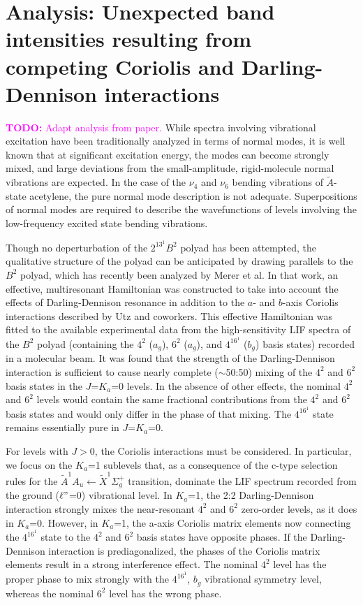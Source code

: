 \documentclass[12pt,draft]{mitthesis}
\newcommand{\TODO} [1]{\textcolor{magenta}{\textbf{TODO:} #1}}
\newcommand{\POINT}[1]{\textcolor{magenta}{#1}}
\begin{document}

\section{Analysis: Unexpected band intensities resulting from
  competing Coriolis and Darling-Dennison interactions}

\TODO{Adapt analysis from paper.}  While spectra involving vibrational
excitation have been traditionally analyzed in terms of normal modes,
it is well known that at significant excitation energy, the modes can
become strongly mixed, and large deviations from the small-amplitude,
rigid-molecule normal vibrations are expected.  In the case of the
$\nu_4$ and $\nu_6$ bending vibrations of $\tilde{A}$-state acetylene,
the pure normal mode description is not adequate. Superpositions of
normal modes are required to describe the wavefunctions of levels
involving the low-frequency excited state bending vibrations.

Though no deperturbation of the $2^13^1B^2$ polyad has been attempted,
the qualitative structure of the polyad can be anticipated by drawing
parallels to the $B^2$ polyad, which has recently been analyzed by
Merer et al.  In that work, an effective, multiresonant Hamiltonian
was constructed to take into account the effects of Darling-Dennison
resonance in addition to the $a$- and $b$-axis Coriolis interactions
described by Utz and coworkers.  This effective Hamiltonian was fitted
to the available experimental data from the high-sensitivity LIF
spectra of the $B^2$ polyad (containing the $4^2$ ($a_g$), $6^2$
($a_g$), and $4^16^1$ ($b_g$) basis states) recorded in a molecular
beam. It was found that the strength of the Darling-Dennison
interaction is sufficient to cause nearly complete ($\sim$50:50)
mixing of the $4^2$ and $6^2$ basis states in the $J$=$K_a$=0
levels. In the absence of other effects, the nominal $4^2$ and $6^2$
levels would contain the same fractional contributions from the $4^2$
and $6^2$ basis states and would only differ in the phase of that
mixing.  The $4^16^1$ state remains essentially pure in $J$=$K_a$=0.

For levels with $J>0$, the Coriolis interactions must be
considered. In particular, we focus on the $K_a$=1 sublevels that, as
a consequence of the c-type selection rules for the $\tilde{A}^1A_u
\leftarrow \tilde{X} ^1\Sigma_g^+$ transition, dominate the LIF
spectrum recorded from the ground ($\ell"$=0) vibrational level. In
$K_a$=1, the 2:2 Darling-Dennison interaction strongly mixes the
near-resonant $4^2$ and $6^2$ zero-order levels, as it does in
$K_a$=0. However, in $K_a$=1, the a-axis Coriolis matrix elements now
connecting the $4^16^1$ state to the $4^2$ and $6^2$ basis states have
opposite phases. If the Darling-Dennison interaction is
prediagonalized, the phases of the Coriolis matrix elements result in
a strong interference effect. The nominal $4^2$ level has the proper
phase to mix strongly with the $4^16^1$, $b_g$ vibrational symmetry
level, whereas the nominal $6^2$ level has the wrong phase.
\end{document}
